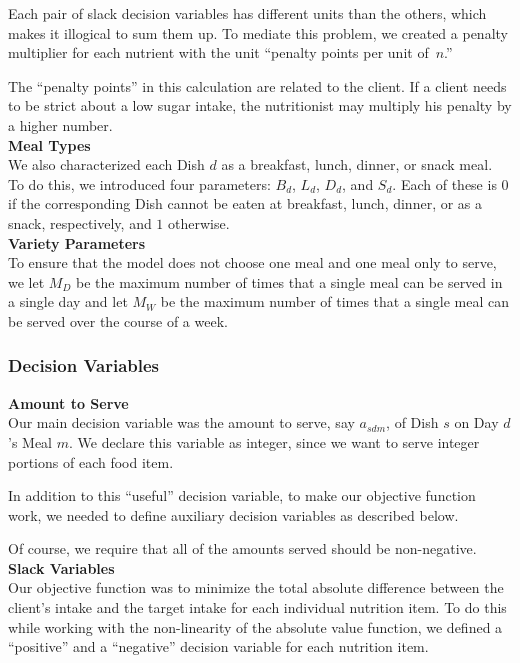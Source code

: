 \documentclass[twoside]{article}
\begin{document}
Each pair of slack decision variables has different units than the others, which makes it illogical to sum them up. To mediate this problem, we created a penalty multiplier for each nutrient with the unit ``penalty points per unit of~$n$.''

The ``penalty points'' in this calculation are related to the client. If a client needs to be strict about a low sugar intake, the nutritionist may multiply his penalty by a higher number.\\[.1in]
\textbf{Meal Types}\\[.1in]
We also characterized each Dish $d$ as a breakfast, lunch, dinner, or snack meal. To do this, we introduced four parameters: $B_d$, $L_d$, $D_d$, and $S_d$. Each of these is $0$ if the corresponding Dish cannot be eaten at breakfast, lunch, dinner, or as a snack, respectively, and $1$ otherwise.\\[.1in]
\textbf{Variety Parameters}\\[.1in]
To ensure that the model does not choose one meal and one meal only to serve, we let $M_D$ be the maximum number of times that a single meal can be served in a single day and let $M_W$ be the maximum number of times that a single meal can be served over the course of a week.

\subsubsection{Decision Variables}
\textbf{Amount to Serve}\\[.1in]
\noindent Our main decision variable was the amount to serve, say $a_{sdm}$, of Dish $s$ on Day $d$'s Meal $m$. We declare this variable as integer, since we want to serve integer portions of each food item.

In addition to this ``useful'' decision variable, to make our objective function work, we needed to define auxiliary decision variables as described below.

Of course, we require that all of the amounts served should be non-negative.\\[.1in]
\textbf{Slack Variables}\\[.1in]
\label{sec:slack}
\noindent Our objective function was to minimize the total absolute difference between the client's intake and the target intake for each individual nutrition item. To do this while working with the non-linearity of the absolute value function, we defined a ``positive'' and a ``negative'' decision variable for each nutrition item. 
\end{document}
